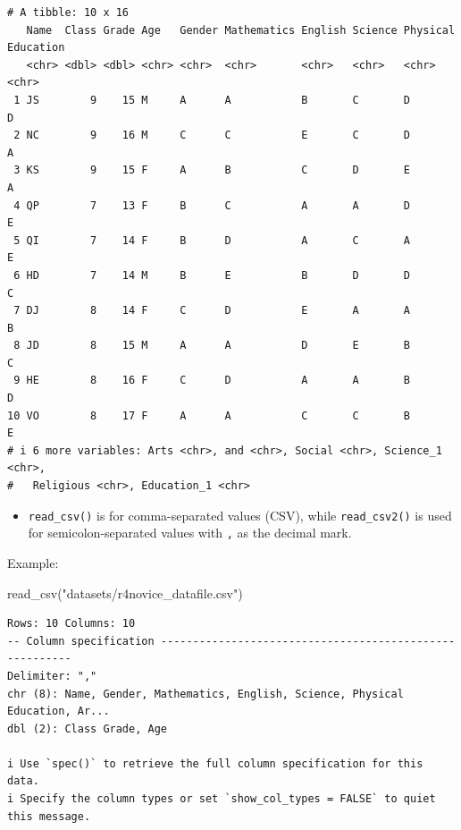\documentclass[
  letterpaper,
  DIV=11,
  numbers=noendperiod]{scrreprt}
\newenvironment{Shaded}{\begin{snugshade}}{\end{snugshade}}
\newcommand{\FunctionTok}[1]{\textcolor[rgb]{0.28,0.35,0.67}{#1}}
\newcommand{\NormalTok}[1]{\textcolor[rgb]{0.00,0.23,0.31}{#1}}
\newcommand{\StringTok}[1]{\textcolor[rgb]{0.13,0.47,0.30}{#1}}
\providecommand{\tightlist}{%
  \setlength{\itemsep}{0pt}\setlength{\parskip}{0pt}}\usepackage{longtable,booktabs,array}
\begin{document}
\begin{verbatim}
# A tibble: 10 x 16
   Name  Class Grade Age   Gender Mathematics English Science Physical Education
   <chr> <dbl> <dbl> <chr> <chr>  <chr>       <chr>   <chr>   <chr>    <chr>    
 1 JS        9    15 M     A      A           B       C       D        D        
 2 NC        9    16 M     C      C           E       C       D        A        
 3 KS        9    15 F     A      B           C       D       E        A        
 4 QP        7    13 F     B      C           A       A       D        E        
 5 QI        7    14 F     B      D           A       C       A        E        
 6 HD        7    14 M     B      E           B       D       D        C        
 7 DJ        8    14 F     C      D           E       A       A        B        
 8 JD        8    15 M     A      A           D       E       B        C        
 9 HE        8    16 F     C      D           A       A       B        D        
10 VO        8    17 F     A      A           C       C       B        E        
# i 6 more variables: Arts <chr>, and <chr>, Social <chr>, Science_1 <chr>,
#   Religious <chr>, Education_1 <chr>
\end{verbatim}

\begin{itemize}
\tightlist
\item
  \texttt{read\_csv()} is for comma-separated values (CSV), while
  \texttt{read\_csv2()} is used for semicolon-separated values with
  \texttt{,} as the decimal mark.
\end{itemize}

Example:

\begin{Shaded}
\begin{Highlighting}[]
\FunctionTok{read\_csv}\NormalTok{(}\StringTok{"datasets/r4novice\_datafile.csv"}\NormalTok{)}
\end{Highlighting}
\end{Shaded}

\begin{verbatim}
Rows: 10 Columns: 10
-- Column specification --------------------------------------------------------
Delimiter: ","
chr (8): Name, Gender, Mathematics, English, Science, Physical Education, Ar...
dbl (2): Class Grade, Age

i Use `spec()` to retrieve the full column specification for this data.
i Specify the column types or set `show_col_types = FALSE` to quiet this message.
\end{verbatim}
\end{document}
